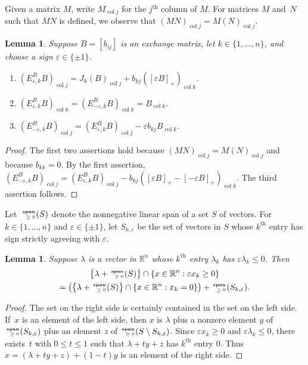 \documentclass{amsart}
\newtheorem{lemma}[proposition]{Lemma}
\theoremstyle{definition}
\theoremstyle{remark}
\numberwithin{equation}{section}
\newcommand{\reals}{\mathbb R}
\newcommand{\ep}{\varepsilon}
\newcommand{\col}{\operatorname{col}}
\newcommand{\sgn}{\operatorname{sgn}}
\newcommand{\nnspan}{{\!\!\tiny\begin{array}{r}\mathbf{span}\\\ge0\end{array}\hspace*{-0.57em}}}
\newcommand{\set}[1]{{\lbrace #1 \rbrace}}
\newcommand{\sett}[1]{{\bigl\lbrace #1 \bigr\rbrace}}
\renewcommand{\th}{^\text{th}}
\newcommand{\0}{{\mathbf{0}}}
\renewcommand{\th}{^\text{th}}
\begin{document}
Given a matrix $M$, write $M_{\col j}$ for the $j\th$ column of $M$.
For matrices $M$ and~$N$ such that $MN$ is defined, we observe that $(MN)_{\col j}=M(N)_{\col j}$.
\begin{lemma}\label{columns lem}
Suppose $B=[b_{ij}]$ is an exchange matrix, let $k\in\set{1,\ldots,n}$, and choose a sign $\ep\in\set{\pm1}$.
\begin{enumerate}[label=\bf\arabic*., ref=\arabic*]
\item \label{col j}
$(E_{\ep,k}^BB)_{\col j}=J_k(B)_{\col j}+b_{kj}([\ep B]_+)_{\col k}$.
\item \label{col k}
$(E_{\ep,k}^BB)_{\col k}=(E_{-\ep,k}^BB)_{\col k}=B_{\col k}$.
\item \label{cols k}
$(E_{-\ep,k}^BB)_{\col j}=(E_{\ep,k}^BB)_{\col j}-\ep b_{kj}B_{\col k}$.
\end{enumerate}
\end{lemma}
\begin{proof}
The first two assertions hold because $(MN)_{\col j}=M(N)_{\col j}$ and because $b_{kk}=0$.
By the first assertion, $(E_{-\ep,k}^BB)_{\col j}=(E_{\ep,k}^BB)_{\col j}-b_{kj}([\ep B]_+-[-\ep B]_+)_{\col k}$.  
The third assertion follows.
\end{proof}

Let~$\nnspan(S)$ denote the nonnegative linear span of a set $S$ of vectors.
For ${k\in\set{1,\ldots,n}}$ and $\ep\in\set{\pm1}$, let $S_{k,\ep}$ be the set of vectors in $S$ whose $k\th$ entry has sign strictly agreeing with $\ep$.

\begin{lemma}\label{ps lemma}
Suppose $\lambda$ is a vector in $\reals^n$ whose $k\th$ entry $\lambda_k$ has $\ep\lambda_k\le0$.
Then %
\begin{multline*}
\sett{\lambda+\nnspan(S)}\cap\set{x\in\reals^n:\ep x_k\ge0}\\
=\bigl(\sett{\lambda+\nnspan(S)}\cap\set{x\in\reals^n:x_k=0}\bigr)+\nnspan(S_{k,\ep}).
\end{multline*}
\end{lemma}
\begin{proof}
The set on the right side is certainly contained in the set on the left side.
If~$x$ is an element of the left side, then $x$ is $\lambda$ plus a nonzero element $y$ of $\nnspan(S_{k,\ep})$ plus an element $z$ of $\nnspan(S\setminus S_{k,\ep})$.
Since $\ep x_k\ge0$ and $\ep\lambda_k\le0$, there exists~$t$ with ${0\le t\le1}$ such that $\lambda+ty+z$ has $k\th$ entry $0$.
Thus ${x=(\lambda+ty+z)+(1-t)y}$ is an element of the right side.
\end{proof}
\end{document}
